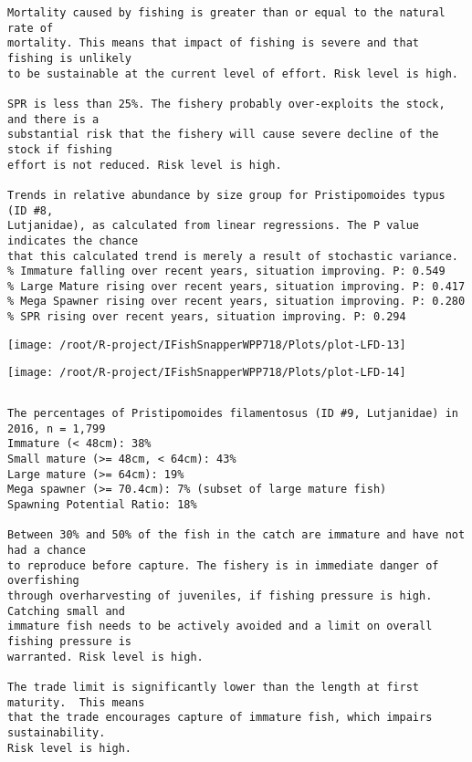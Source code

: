 \documentclass{report}\usepackage[]{graphicx}\usepackage[]{color}
\makeatletter
\def\maxwidth{ %
  \ifdim\Gin@nat@width>\linewidth
    \linewidth
  \else
    \Gin@nat@width
  \fi
}
\newenvironment{kframe}{%
 \def\at@end@of@kframe{}%
 \ifinner\ifhmode%
  \def\at@end@of@kframe{\end{minipage}}%
  \begin{minipage}{\columnwidth}%
 \fi\fi%
 \def\FrameCommand##1{\hskip\@totalleftmargin \hskip-\fboxsep
 \colorbox{shadecolor}{##1}\hskip-\fboxsep
     \hskip-\linewidth \hskip-\@totalleftmargin \hskip\columnwidth}%
 \MakeFramed {\advance\hsize-\width
   \@totalleftmargin\z@ \linewidth\hsize
   \@setminipage}}%
 {\par\unskip\endMakeFramed%
 \at@end@of@kframe}
\newenvironment{knitrout}{}{} %
\makeatother
\begin{document}
\begin{knitrout}
\begin{kframe}
\begin{verbatim}
Mortality caused by fishing is greater than or equal to the natural rate of
mortality. This means that impact of fishing is severe and that fishing is unlikely
to be sustainable at the current level of effort. Risk level is high.
 
SPR is less than 25%. The fishery probably over-exploits the stock, and there is a
substantial risk that the fishery will cause severe decline of the stock if fishing
effort is not reduced. Risk level is high.
 
Trends in relative abundance by size group for Pristipomoides typus (ID #8,
Lutjanidae), as calculated from linear regressions. The P value indicates the chance
that this calculated trend is merely a result of stochastic variance.
% Immature falling over recent years, situation improving. P: 0.549
% Large Mature rising over recent years, situation improving. P: 0.417
% Mega Spawner rising over recent years, situation improving. P: 0.280
% SPR rising over recent years, situation improving. P: 0.294
\end{verbatim}
\end{kframe}
\texttt{[image: /root/R-project/IFishSnapperWPP718/Plots/plot-LFD-13]} 

\texttt{[image: /root/R-project/IFishSnapperWPP718/Plots/plot-LFD-14]} 
\begin{kframe}\begin{verbatim}
\end{verbatim}
\end{kframe}
\clearpage
\newpage
\begin{kframe}\begin{verbatim}The percentages of Pristipomoides filamentosus (ID #9, Lutjanidae) in 2016, n = 1,799
Immature (< 48cm): 38%
Small mature (>= 48cm, < 64cm): 43%
Large mature (>= 64cm): 19%
Mega spawner (>= 70.4cm): 7% (subset of large mature fish)
Spawning Potential Ratio: 18%
 
Between 30% and 50% of the fish in the catch are immature and have not had a chance
to reproduce before capture. The fishery is in immediate danger of overfishing
through overharvesting of juveniles, if fishing pressure is high.  Catching small and
immature fish needs to be actively avoided and a limit on overall fishing pressure is
warranted. Risk level is high.

The trade limit is significantly lower than the length at first maturity.  This means
that the trade encourages capture of immature fish, which impairs sustainability.
Risk level is high.


\end{verbatim}
\end{kframe}
\end{knitrout}
\end{document}

